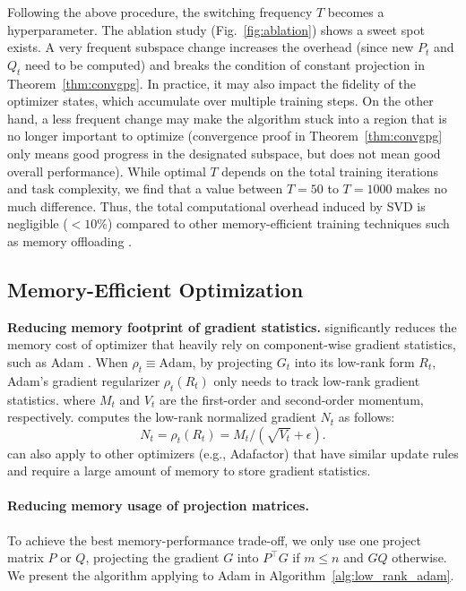 Following the above procedure, the switching frequency $T$ becomes a hyperparameter. The ablation study (Fig.~\ref{fig:ablation}) shows a sweet spot exists. A very frequent subspace change increases the overhead (since new $P_t$ and $Q_t$ need to be computed) and breaks the condition of constant projection in Theorem~\ref{thm:convgpg}. In practice, it may also impact the fidelity of the optimizer states, which accumulate over multiple training steps. On the other hand, a less frequent change may make the algorithm stuck into a region that is no longer important to optimize (convergence proof in Theorem~\ref{thm:convgpg} only means good progress in the designated subspace, but does not mean good overall performance). While optimal $T$ depends on the total training iterations and task complexity, we find that a value between $T=50$ to $T=1000$ makes no much difference. Thus, the total computational overhead induced by SVD is negligible ($< 10\%$) compared to other memory-efficient training techniques such as memory offloading \citep{rajbhandariZeROMemoryOptimizations2020}.

\subsection{Memory-Efficient Optimization}


\textbf{Reducing memory footprint of gradient statistics.} \lowrank{} significantly reduces the memory cost of optimizer that heavily rely on component-wise gradient statistics, such as Adam \citep{kingmaAdamMethodStochastic2014}. 
When $\rho_t \equiv \mathrm{Adam}$, by projecting $G_t$ into its low-rank form $R_t$, Adam's gradient regularizer $\rho_t(R_t)$ only needs to track low-rank gradient statistics.
where $M_t$ and $V_t$ are the first-order and second-order momentum, respectively. 
\lowrank{} computes the low-rank normalized gradient $N_t$ as follows:
\begin{equation}
    \label{eq:low_rank_normalized_gradient}
    N_t = \rho_t(R_t) = M_t / (\sqrt{V_t} + \epsilon).
\end{equation}
\lowrank{} can also apply to other optimizers (e.g., Adafactor) that have similar update rules and require a large amount of memory to store gradient statistics. 
\paragraph{Reducing memory usage of projection matrices.} To achieve the best memory-performance trade-off, we only use one project matrix $P$ or $Q$, projecting the gradient $G$ into $P^\top G$ if $m \leq n$ and $G Q$ otherwise. We present the algorithm applying \lowrank{} to Adam in Algorithm~\ref{alg:low_rank_adam}. 

